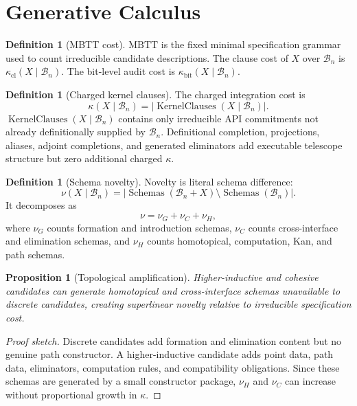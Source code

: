 \documentclass[11pt]{article}
\theoremstyle{plain}
\newtheorem{proposition}[theorem]{Proposition}
\theoremstyle{definition}
\newtheorem{definition}[theorem]{Definition}
\theoremstyle{remark}
\newenvironment{proofsketch}{\begin{proof}[Proof sketch]}{\end{proof}}
\newcommand{\MBTT}{\mathrm{MBTT}}
\newcommand{\B}{\mathcal{B}}
\newcommand{\Schemas}{\operatorname{Schemas}}
\newcommand{\KernelClauses}{\operatorname{KernelClauses}}
\begin{document}
\section{Generative Calculus}

\begin{definition}[MBTT cost]
\(\MBTT\) is the fixed minimal specification grammar used to count irreducible candidate descriptions. The clause cost of \(X\) over \(\B_n\) is \(\kappa_{\mathrm{cl}}(X\mid\B_n)\). The bit-level audit cost is \(\kappa_{\mathrm{bit}}(X\mid\B_n)\).
\end{definition}

\begin{definition}[Charged kernel clauses]
The charged integration cost is
\[
\kappa(X\mid\B_n)
=
\left|\KernelClauses(X\mid\B_n)\right|.
\]
\(\KernelClauses(X\mid\B_n)\) contains only irreducible API commitments not already definitionally supplied by \(\B_n\). Definitional completion, projections, aliases, adjoint completions, and generated eliminators add executable telescope structure but zero additional charged \(\kappa\).
\end{definition}

\begin{definition}[Schema novelty]
Novelty is literal schema difference:
\[
\nu(X\mid\B_n)
=
|\Schemas(\B_n+X)\setminus\Schemas(\B_n)|.
\]
It decomposes as
\[
\nu=\nu_G+\nu_C+\nu_H,
\]
where \(\nu_G\) counts formation and introduction schemas, \(\nu_C\) counts cross-interface and elimination schemas, and \(\nu_H\) counts homotopical, computation, Kan, and path schemas.
\end{definition}

\begin{proposition}[Topological amplification]
Higher-inductive and cohesive candidates can generate homotopical and cross-interface schemas unavailable to discrete candidates, creating superlinear novelty relative to irreducible specification cost.
\end{proposition}

\begin{proofsketch}
Discrete candidates add formation and elimination content but no genuine path constructor. A higher-inductive candidate adds point data, path data, eliminators, computation rules, and compatibility obligations. Since these schemas are generated by a small constructor package, \(\nu_H\) and \(\nu_C\) can increase without proportional growth in \(\kappa\).
\end{proofsketch}
\end{document}
